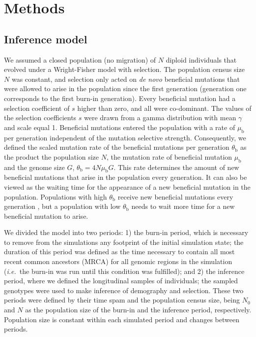 \documentclass[a4paper, 12pt]{article}
\begin{document}
\section*{Methods}

\subsection*{Inference model}

We assumed a closed population (no migration) of $N$ diploid individuals that evolved under a Wright-Fisher model with selection. The population census size $N$ was constant, and selection only acted on \textit{de novo} beneficial mutations that were allowed to arise in the population since the first generation (generation one corresponds to the first burn-in generation). Every beneficial mutation had a selection coefficient of $s$ higher than zero, and all were co-dominant. The values of the selection coefficients $s$ were drawn from a gamma distribution with mean $\gamma$ and scale equal 1. Beneficial mutations entered the population with a rate of $\mu_\mathrm{b}$ per generation independent of the mutation selective strength. Consequently, we defined the scaled mutation rate of the beneficial mutations per generation $\theta_\mathrm{b}$ as the product the population size $N$, the mutation rate of beneficial mutation $\mu_\mathrm{b}$ and the genome size $G$, $\theta_\mathrm{b} = 4N\mu_\mathrm{b}G$. This rate determines the amount of new beneficial mutations that arise in the population every generation. It can also be viewed as the waiting time for the appearance of a new beneficial mutation in the population. Populations with high $\theta_\mathrm{b}$ receive new beneficial mutations every generation \citep{Karasov:2010di}, but a population with low $\theta_\mathrm{b}$ needs to wait more time for a new beneficial mutation to arise.

We divided the model into two periods: 1) the burn-in period, which is necessary to remove from the simulations any footprint of the initial simulation state; the duration of this period was defined as the time necessary to contain all most recent common ancestors (MRCA) for all genomic regions in the simulation (\textit{i.e.}\ the burn-in was run until this condition was fulfilled); and 2) the inference period, where we defined the longitudinal samples of individuals; the sampled genotypes were used to make inference of demography and selection. These two periods were defined by their time spam and the population census size, being $N_\mathrm{0}$ and $N$ as the population size of the burn-in and the inference period, respectively. Population size is constant within each simulated period and changes between periods.
\end{document}
